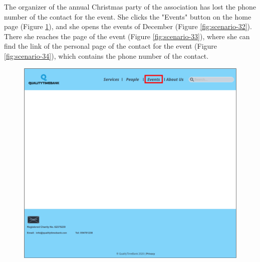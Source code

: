 \documentclass[a4paper, 11pt, parskip=half, headsepline]{scrreprt}
\begin{document}
The organizer of the annual Christmas party of the association has lost the phone number of the contact for the event. She clicks the "Events" button on the home page (Figure \ref{fig:scenario-31}), and she opens the events of December (Figure \ref{fig:scenario-32}). There she reaches the page of the event (Figure \ref{fig:scenario-33}), where she can find the link of the personal page of the contact for the event (Figure \ref{fig:scenario-34}), which contains the phone number of the contact.

\begin{figure}[H]
	\centering
	\includegraphics[width=1\linewidth, keepaspectratio]{scenarios/scenario-31}
	\caption{}
	\label{fig:scenario-31}
\end{figure}
\end{document}
